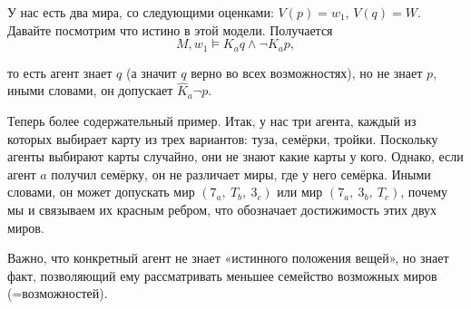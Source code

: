 \documentclass[openany]{book}
\theoremstyle{plain}
\theoremstyle{definition}
\begin{document}
\begin{figure}
\centering
{}
\end{figure}

У нас есть два мира, со следующими оценками: \(V(p) = {w_1}\), \(V(q) = W\). Давайте посмотрим что истино в этой модели. Получается \[M, w_1 \models K_a q \land \neg K_a p,\]

то есть агент знает \(q\) (а значит \(q\) верно во всех возможностях), но не знает \(p\), иными словами, он допускает \(\hat{K}_a \neg p\).

Теперь более содержательный пример. Итак, у нас три агента, каждый из которых выбирает карту из трех вариантов: туза, семёрки, тройки. Поскольку агенты выбирают карты случайно, они не знают какие карты у кого. Однако, если агент \(a\) получил семёрку, он не различает миры, где у него семёрка. Иными словами, он может допускать мир \((7_a,\ T_b, \ 3_c)\) или мир \((7_a, \ 3_b, \ T_c)\), почему мы и связываем их красным ребром, что обозначает достижимость этих двух миров.

Важно, что конкретный агент не знает «истинного положения вещей», но знает факт, позволяющий ему рассматривать меньшее семейство возможных миров (=возможностей).
\end{document}
